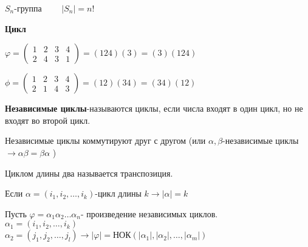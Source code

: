 \documentclass[12pt]{article}
\begin{document}
$S_n$-группа  $\qquad |S_n|=n!$

\textbf{Цикл}

$\varphi=\begin{pmatrix}
1 & 2 & 3 & 4 \\
2 & 4 & 3 & 1
\end{pmatrix}=(124)(3)=(3)(124)$

$\phi=\begin{pmatrix}
1 & 2 & 3 & 4 \\
2 & 1 & 4 & 3
\end{pmatrix}=(12)(34)=(34)(12)$

\textbf{Независимые циклы}-называются циклы, если числа входят в один цикл, но не входят во второй цикл.

\begin{Th}
	Независимые циклы коммутируют друг с другом (или $\alpha ,\beta$-независимые циклы $\rightarrow \alpha\beta=\beta\alpha$ )
\end{Th}

\begin{Def}
	Циклом длины два называется транспозиция.
\end{Def}

\begin{Th}
	Если $\alpha=(i_1,i_2, \dots ,i_k)$-цикл длины $k \rightarrow |\alpha|=k$
\end{Th}

\begin{Th}
	Пусть $\varphi=\alpha_1\alpha_2\dots\alpha_n$- произведение независимых циклов.\\
	$\alpha_1=(i_1,i_2,\dots, i_k)$\\
	$\alpha_2=(j_1,j_2,\dots, j_l) \rightarrow |\varphi|=$НОК$(|\alpha_1|,|\alpha_2|,\dots,|\alpha_m|)$
\end{Th}
\end{document}
